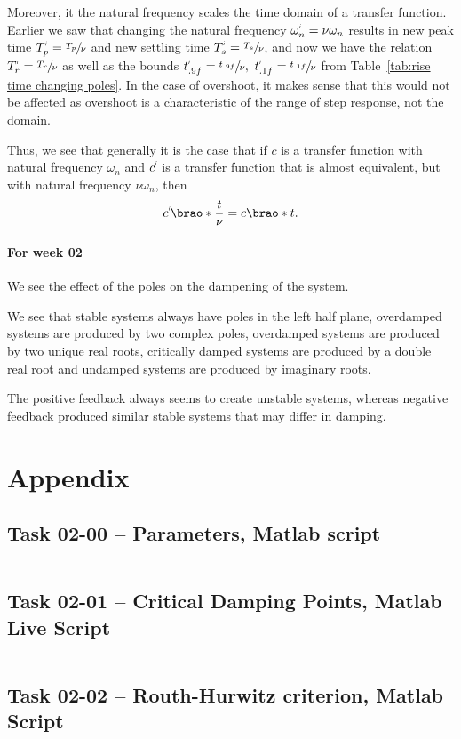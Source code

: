 \documentclass[12pt]{article}
\DeclarePairedDelimiter\brao()%
\newcommand{\setprime}[2][1]{%
    {#2}^{%
        \raisebox{1pt}{%
            \scalebox{0.5}{%
                \itshape\sffamily\uppercase%
                \expandafter{%
                    \romannumeral#1%
                }%
            }%
        }
    }%
}%
\begin{document}
Moreover, it the natural frequency
scales the time domain
of a transfer function.
Earlier we saw that changing the natural frequency $\setprime\omega_n = \nu\omega_n$ results in
new peak time $\setprime{T}_p = \sfrac{T_p}\nu$ and
new settling time $\setprime{T}_s = \sfrac{T_s}\nu$,
and now we have the relation $\setprime{T}_r = \sfrac{T_r}\nu$
as well as the bounds $\setprime{t}_{.9f} = \sfrac{t_{.9f}}\nu,\ \setprime{t}_{.1f} = \sfrac{t_{.1f}}\nu$
from Table~\ref{tab:rise time changing poles}.
In the case of overshoot, it makes sense that this would not be affected
as overshoot is a characteristic of the range of step response, not the domain.

Thus, we see that generally it is the case that if $c$ is a transfer function with natural frequency $\omega_n$
and $\setprime{c}$ is a transfer function that is almost equivalent, but with natural frequency $\nu\omega_n$,
then
\begin{equation}
    \setprime{c}\brao*{\frac{t}\nu} = c\brao*t.
\end{equation}

\paragraph{For week 02}

We see the effect of the poles on the dampening of the system.

We see that stable systems always have poles in the left half plane, overdamped systems are produced by two complex poles, overdamped systems are produced by two unique real roots, critically damped systems are produced by a double real root and undamped systems are produced by imaginary roots.

The positive feedback always seems to create unstable systems, whereas negative feedback produced similar stable systems that may differ in damping.

\newpage
\printbibliography

\newpage
\appendix
\section{Appendix}

\subsection{Task 02-00 -- Parameters, Matlab script}
\inputminted{matlab}{src/task02_00_simulation_params.m}

\subsection{Task 02-01 -- Critical Damping Points, Matlab Live Script}
\inputminted{matlab}{src/task02_01_critical_damping_points_mlx.m}

\subsection{Task 02-02 -- Routh-Hurwitz criterion, Matlab Script}
\inputminted{matlab}{src/task02_02_routh_hurwitz.m}
\end{document}
